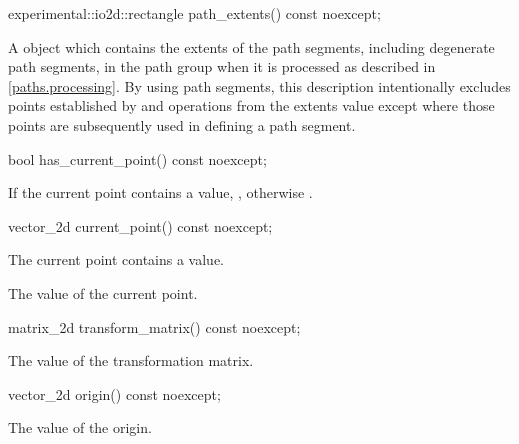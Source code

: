 \begin{itemdecl}
experimental::io2d::rectangle path_extents() const noexcept;
\end{itemdecl}
\begin{itemdescr}
\pnum
\returns
A  object which contains the extents of the path segments, including degenerate path segments, in the path group when it is processed as described in \ref{paths.processing}.
\enternote
By using path segments, this description intentionally excludes points established by  and  operations from the extents value except where those points are subsequently used in defining a path segment.
\exitnote
\end{itemdescr}

\begin{itemdecl}
bool has_current_point() const noexcept;
\end{itemdecl}
\begin{itemdescr}
\pnum
\returns
If the current point contains a value, , otherwise .
\end{itemdescr}

\begin{itemdecl}
vector_2d current_point() const noexcept;
\end{itemdecl}
\begin{itemdescr}
\pnum
\requires
The current point contains a value.

\pnum
\returns
The value of the current point.
\end{itemdescr}

\begin{itemdecl}
matrix_2d transform_matrix() const noexcept;
\end{itemdecl}
\begin{itemdescr}
\pnum
\returns
The value of the transformation matrix.
\end{itemdescr}

\begin{itemdecl}
vector_2d origin() const noexcept;
\end{itemdecl}
\begin{itemdescr}
\pnum
\returns
The value of the origin.
\end{itemdescr}

